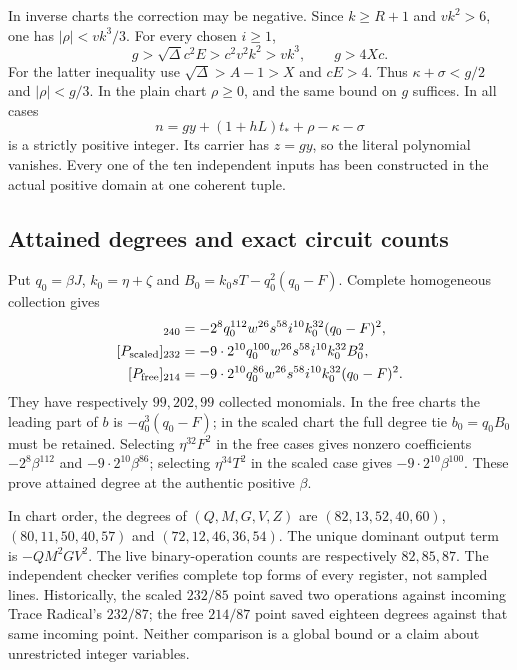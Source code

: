 In inverse charts the correction may be negative. Since $k\ge R+1$
and $vk^2>6$, one has $|\rho|<vk^3/3$. For every chosen $i\ge1$,
\[
 g>\sqrt\Delta c^2E>c^2v^2k^2>vk^3,\qquad g>4Xc.
\]
For the latter inequality use $\sqrt\Delta>A-1>X$ and $cE>4$.
Thus $\kappa+\sigma<g/2$ and $|\rho|<g/3$.
In the plain chart $\rho\ge0$, and the same bound on $g$ suffices.
In all cases
\[
 n=gy+(1+hL)t_*+\rho-\kappa-\sigma
\]
is a strictly positive integer. Its carrier has $z=gy$, so the literal
polynomial vanishes. Every one of the ten independent inputs has been
constructed in the actual positive domain at one coherent tuple.

\subsection{Attained degrees and exact circuit counts}
Put $q_0=\beta J$, $k_0=\eta+\zeta$ and
$B_0=k_0sT-q_0^2(q_0-F)$. Complete homogeneous collection gives
\begin{align*}
 [P_{\rm plain}]_{240}
 &=-2^8q_0^{112}w^{26}s^{58}i^{10}k_0^{32}(q_0-F)^2,\\
 [P_{\rm scaled}]_{232}
 &=-9\cdot2^{10}q_0^{100}w^{26}s^{58}i^{10}k_0^{32}B_0^2,\\
 [P_{\rm free}]_{214}
 &=-9\cdot2^{10}q_0^{86}w^{26}s^{58}i^{10}k_0^{32}(q_0-F)^2.
\end{align*}
They have respectively $99,202,99$ collected monomials. In the free
charts the leading part of $b$ is $-q_0^3(q_0-F)$; in the scaled
chart the full degree tie $b_0=q_0B_0$ must be retained.
Selecting $\eta^{32}F^2$ in the free cases gives nonzero coefficients
$-2^8\beta^{112}$ and $-9\cdot2^{10}\beta^{86}$; selecting
$\eta^{34}T^2$ in the scaled case gives $-9\cdot2^{10}\beta^{100}$.
These prove attained degree at the authentic positive $\beta$.

In chart order, the degrees of $(Q,M,G,V,Z)$ are
$(82,13,52,40,60)$, $(80,11,50,40,57)$ and $(72,12,46,36,54)$.
The unique dominant output term is $-QM^2GV^2$.
The live binary-operation counts are respectively $82,85,87$.
The independent checker verifies complete top forms of every register,
not sampled lines. Historically, the scaled $232/85$ point saved two operations against
incoming Trace Radical's $232/87$; the free $214/87$ point saved eighteen
degrees against that same incoming point. Neither comparison is a global
bound or a claim about unrestricted integer variables.
